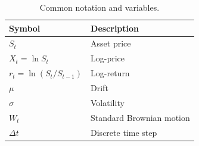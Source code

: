 \documentclass[sigconf]{acmart}
\begin{document}
      \begin{table}[h]
        \centering
        \caption{Common notation and variables.}
        \label{tab:notation}
        \begin{tabular}{ll}
        \toprule
        \textbf{Symbol} & \textbf{Description} \\
        \midrule
        \( S_t \) & Asset price \\
        \( X_t = \ln S_t \) & Log-price \\
        \( r_t = \ln(S_t / S_{t-1}) \) & Log-return \\
        \( \mu \) & Drift \\
        \( \sigma \) & Volatility \\
        \( W_t \) & Standard Brownian motion \\
        \( \Delta t \) & Discrete time step \\
        \bottomrule
        \end{tabular}
      \end{table}
        
        
\end{document}
